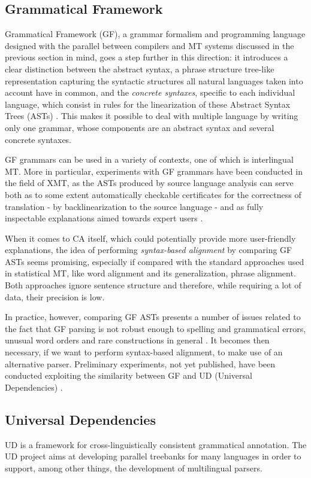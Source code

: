 \documentclass{article}
\begin{document}
\subsection{Grammatical Framework}
Grammatical Framework (GF), a grammar formalism and programming language designed with the parallel between compilers and MT systems discussed in the previous section in mind, goes a step further in this direction: it introduces a clear distinction between the abstract syntax, a phrase structure tree-like representation capturing the syntactic structures all natural languages taken into account have in common, and the \textit{concrete syntaxes}, specific to each individual language, which consist in rules for the linearization of these Abstract Syntax Trees (ASTs) \cite{gf2004} \cite{gfbook}. 
This makes it possible to deal with multiple language by writing only one grammar, whose components are an abstract syntax and several concrete syntaxes. 

GF grammars can be used in a variety of contexts, one of which is interlingual MT. More in particular, experiments with GF grammars have been conducted in the field of XMT, as the ASTs produced by source language analysis can serve both as to some extent automatically checkable certificates for the correctness of translation - by backlinearization to the source language - and as fully inspectable explanations aimed towards expert users \cite{rantaxmt}.

When it comes to CA itself, which could potentially provide more user-friendly explanations, the idea of performing \textit{syntax-based alignment} by comparing GF ASTs seems promising, especially if compared with the standard approaches used in statistical MT, like word alignment and its generalization, phrase alignment. Both approaches ignore sentence structure and therefore, while requiring a lot of data, their precision is low. 

In practice, however, comparing GF ASTs presents a number of issues related to the fact that GF parsing is not robust enough to spelling and grammatical errors, unusual word orders and rare constructions in general \cite{rantaxmt}. It becomes then necessary, if we want to perform syntax-based alignment, to make use of an alternative parser. Preliminary experiments, not yet published, have been conducted exploiting the similarity between GF and UD (Universal Dependencies) \cite{gfud, udgf}.

\subsection{Universal Dependencies}
UD is a framework for cross-linguistically consistent grammatical annotation. 
The UD project aims at developing parallel treebanks for many languages in order to support, among other things, the development of multilingual parsers.
\end{document}
